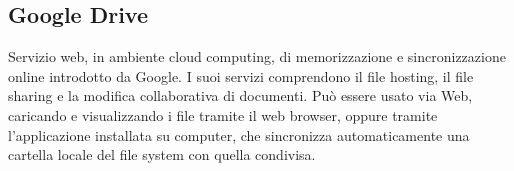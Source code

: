 \subsection*{Google Drive}
Servizio web, in ambiente cloud computing, di memorizzazione e sincronizzazione online introdotto da Google. I suoi servizi comprendono il file hosting, il file sharing e la modifica collaborativa di documenti. Può essere usato via Web, caricando e visualizzando i file tramite il web browser, oppure tramite l'applicazione installata su computer, che sincronizza automaticamente una cartella locale del file system con quella condivisa.